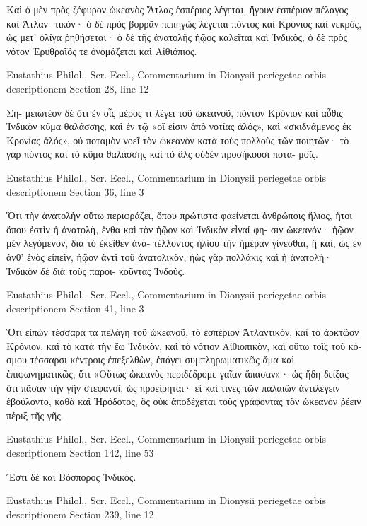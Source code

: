 \documentclass[12pt,letterpaper,twoside,final]{memoir}
\begin{document}
\begin{greek}
              Καὶ ὁ μὲν πρὸς ζέφυρον ὠκεανὸς Ἄτλας 
ἑσπέριος λέγεται, ἤγουν ἑσπέριον πέλαγος καὶ Ἀτλαν-
τικόν· ὁ δὲ πρὸς βορρᾶν πεπηγὼς λέγεται πόντος καὶ 
Κρόνιος καὶ νεκρὸς, ὡς μετ' ὀλίγα ῥηθήσεται· ὁ δὲ 
τῆς ἀνατολῆς ἠῷος καλεῖται καὶ Ἰνδικὸς, ὁ δὲ πρὸς 
νότον Ἐρυθραῖός τε ὀνομάζεται καὶ Αἰθιόπιος. 



Eustathius Philol., Scr. Eccl., Commentarium in Dionysii periegetae orbis descriptionem 
Section 28, line 12

                                                        Ση-
μειωτέον δὲ ὅτι ἐν οἷς μέρος τι λέγει τοῦ ὠκεανοῦ, 
πόντον Κρόνιον καὶ αὖθις Ἰνδικὸν κῦμα θαλάσσης, καὶ 
ἐν τῷ «οἵ εἰσιν ἀπὸ νοτίας ἁλός», καὶ «σκιδνάμενος 
ἐκ Κρονίας ἁλός», οὐ ποταμὸν νοεῖ τὸν ὠκεανὸν κατὰ 
τοὺς πολλοὺς τῶν ποιητῶν· τὸ γὰρ πόντος καὶ τὸ   
κῦμα θαλάσσης καὶ τὸ ἃλς οὐδὲν προσήκουσι ποτα-
μοῖς. 



Eustathius Philol., Scr. Eccl., Commentarium in Dionysii periegetae orbis descriptionem 
Section 36, line 3

Ὅτι τὴν ἀνατολὴν οὕτω περιφράζει, ὅπου 
πρώτιστα φαείνεται ἀνθρώποις ἥλιος, ἤτοι ὅπου ἐστὶν 
ἡ ἀνατολὴ, ἔνθα καὶ τὸν ἠῷον καὶ Ἰνδικὸν εἶναί φη-
σιν ὠκεανόν· ἠῷον μὲν λεγόμενον, διὰ τὸ ἐκεῖθεν ἀνα-
τέλλοντος ἡλίου τὴν ἡμέραν γίνεσθαι, ἢ καὶ, ὡς ἓν 
ἀνθ' ἑνὸς εἰπεῖν, ἠῷον ἀντὶ τοῦ ἀνατολικὸν, ἠὼς γὰρ 
πολλάκις καὶ ἡ ἀνατολή· Ἰνδικὸν δὲ διὰ τοὺς παροι-
κοῦντας Ἰνδούς. 



Eustathius Philol., Scr. Eccl., Commentarium in Dionysii periegetae orbis descriptionem 
Section 41, line 3

Ὅτι εἰπὼν τέσσαρα τὰ πελάγη τοῦ ὠκεανοῦ, 
τὸ ἑσπέριον Ἀτλαντικὸν, καὶ τὸ ἀρκτῶον Κρόνιον, καὶ 
τὸ κατὰ τὴν ἕω Ἰνδικὸν, καὶ τὸ νότιον Αἰθιοπικὸν, 
καὶ οὕτω τοῖς τοῦ κόσμου τέσσαρσι κέντροις ἐπεξελθὼν, 
ἐπάγει συμπληρωματικῶς ἅμα καὶ ἐπιφωνηματικῶς, 
ὅτι «Οὕτως ὠκεανὸς περιδέδρομε γαῖαν ἅπασαν»· ὡς ἤδη 
δείξας ὅτι πᾶσαν τὴν γῆν στεφανοῖ, ὡς προείρηται· εἰ 
καί τινες τῶν παλαιῶν ἀντιλέγειν ἐβούλοντο, καθὰ καὶ 
Ἡρόδοτος, ὃς οὐκ ἀποδέχεται τοὺς γράφοντας τὸν 
ὠκεανὸν ῥέειν πέριξ τῆς γῆς. 



Eustathius Philol., Scr. Eccl., Commentarium in Dionysii periegetae orbis descriptionem 
Section 142, line 53

Ἔστι δὲ καὶ Βόσπορος Ἰνδικός. 



Eustathius Philol., Scr. Eccl., Commentarium in Dionysii periegetae orbis descriptionem 
Section 239, line 12


\end{greek}
\end{document}
